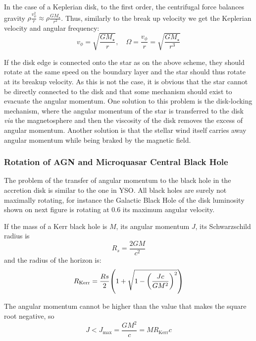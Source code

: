 \documentclass[10pt,a4paper,english]{article}
\let\originalleft\left
\let\originalright\right
\renewcommand{\left}{\mathopen{}\mathclose\bgroup\originalleft}
\renewcommand{\right}{\aftergroup\egroup\originalright}
\begin{document}

In the case of a Keplerian disk, to the first order, the centrifugal force
balances gravity $\rho \frac{v_\phi^2}{r} \approx \rho \frac{GM_\star}{r^2}$.
Thus, similarly to the break up velocity we get the Keplerian velocity and
angular frequency:
\begin{equation}
    v_\phi = \sqrt{\frac{GM_\star}{r}}, \quad \Omega = \frac{v_\phi}{r} = \sqrt{\frac{GM_\star}{r^3}}
\end{equation}

If the disk edge is connected onto the star as on the above scheme, they should
rotate at the same speed on the boundary layer and the star should thus rotate
at its breakup velocity. As this is not the case, it is obvious that the star
cannot be directly connected to the disk and that some mechanism should exist
to evacuate the angular momentum. One solution to this problem is the
disk-locking mechanism, where the angular momentum of the star is transferred
to the disk \emph{via} the magnetosphere and then the viscosity of the disk
removes the excess of angular momentum. Another solution is that the stellar
wind itself carries away angular momentum while being braked by the magnetic
field.

\subsubsection{Rotation of AGN and Microquasar Central Black Hole}

The problem of the transfer of angular momentum to the black hole in the
accretion disk is similar to the one in YSO. All black holes are surely not
maximally rotating, for instance the Galactic Black Hole of the disk luminosity
shown on next figure is rotating at 0.6 its maximum angular velocity.

If the mass of a Kerr black hole is $M$, its angular momentum $J$, its
Schwarzschild radius is
\begin{equation}
    R_s = \frac{2GM}{c^2}
\end{equation}
and the radius of the horizon is:
\begin{equation}
    R_\mathrm{Kerr} = \frac{Rs}{2} \left( 1 + \sqrt{1-\left( \frac{Jc}{GM^2} \right)^2 } \right)
\end{equation}

The angular momentum cannot be higher than the value that makes the square root
negative, so
\begin{equation}
    J < J_\mathrm{max} = \frac{GM^2}{c} = MR_\mathrm{Kerr}c
\end{equation}
\end{document}
